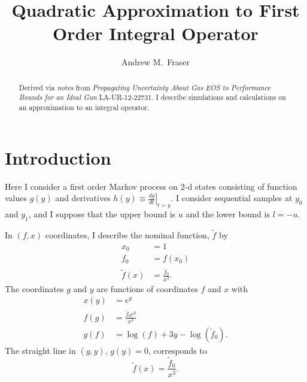 \documentclass[twocolumn]{article}
\title{Quadratic Approximation to First Order Integral Operator}
\author{Andrew M.\ Fraser}
\begin{document}
\maketitle
\begin{abstract}
  Derived via \emph{notes} from \emph{Propagating Uncertainty About
    Gas EOS to Performance Bounds for an Ideal Gun} LA-UR-12-22731.
  I describe simulations and calculations on an approximation to an
  integral operator.
\end{abstract}
\section{Introduction}
  \label{sec:introduction}

Here I consider a first order Markov process on 2-d states consisting
of function values $g(y)$ and derivatives $h(y) \equiv \left. \frac{d
    g }{d t} \right|_{t=y}$.  I consider sequential samples at $y_0$
and $y_1$, and I suppose that the upper bound is $u$ and the lower
bound is $l=-u$.

In $(f,x)$ coordinates, I describe the nominal function, $\tilde f$ by
\begin{align*}
  x_0 &= 1\\
  f_0 &= f(x_0) \\
  \tilde f(x) &= \frac{\tilde f_0}{x^3}.
\end{align*}
The coordinates $g$ and $y$ are functions of coordinates $f$ and $x$ with
\begin{align*}
  x(y) &= e^y \\
  f(g) &= \frac{\tilde f_0 e^{g}}{x^3} \\
  g(f) &= \log(f) + 3y - \log(\tilde f_0).
\end{align*}
The straight line in $(g,y)$, $g(y) = 0$, corresponds to
\begin{equation*}
  \tilde f(x) = \frac{\tilde f_0}{x^3}.
\end{equation*}
\end{document}

